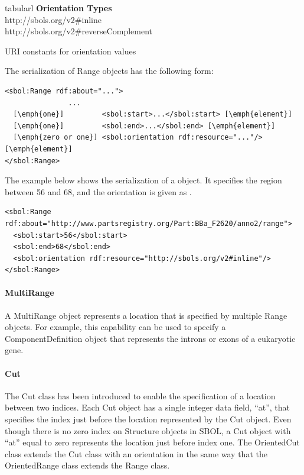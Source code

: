 \begin{table}[ht]
  \begin{edtable}{tabular}{l}
    \toprule
    \textbf{Orientation Types}  \\
    \midrule
    http://sbols.org/v2\#inline\\
    http://sbols.org/v2\#reverseComplement\\
    \bottomrule
  \end{edtable}
  \caption{URI constants for orientation values}
  \label{tbl:orientation_types}
\end{table}

The serialization of Range objects has the following form:
\begin{lstlisting}
<sbol:Range rdf:about="...">
               ...   
  [\emph{one}]         <sbol:start>...</sbol:start> [\emph{element}] 
  [\emph{one}]         <sbol:end>...</sbol:end> [\emph{element}] 
  [\emph{zero or one}] <sbol:orientation rdf:resource="..."/> [\emph{element}] 
</sbol:Range>
\end{lstlisting}

The example below shows the serialization of a  object. It specifies the region between 56 and 68, and the orientation is given as .
\begin{lstlisting}
<sbol:Range rdf:about="http://www.partsregistry.org/Part:BBa_F2620/anno2/range">
  <sbol:start>56</sbol:start>
  <sbol:end>68</sbol:end>
  <sbol:orientation rdf:resource="http://sbols.org/v2#inline"/>
</sbol:Range>
\end{lstlisting}

\paragraph{MultiRange}
\label{sec:MultiRange}
A MultiRange object represents a location that is specified by multiple Range objects. For example, this capability can be used to specify a ComponentDefinition object that represents the introns or exons of a eukaryotic gene.

\paragraph{Cut}
\label{sec:Cut}
The Cut class has been introduced to enable the specification of a location between two indices. Each Cut object has a single integer data field, ``at'', that specifies the index just before the location represented by the Cut object. Even though there is no zero index on Structure objects in SBOL, a Cut object with “at” equal to zero represents the location just before index one. The OrientedCut class extends the Cut class with an orientation in the same way that the OrientedRange class extends the Range class.

